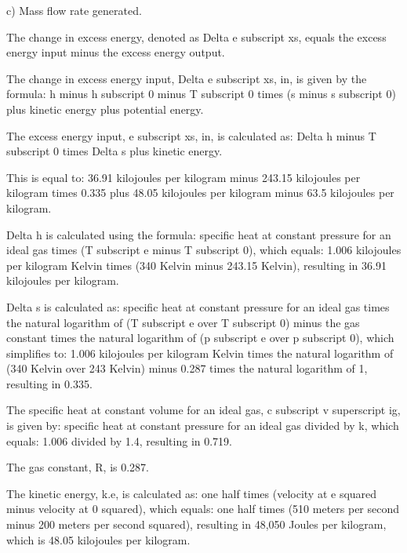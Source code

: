 c) Mass flow rate generated.

The change in excess energy, denoted as Delta e subscript xs, equals the excess energy input minus the excess energy output.

The change in excess energy input, Delta e subscript xs, in, is given by the formula:
h minus h subscript 0 minus T subscript 0 times (s minus s subscript 0) plus kinetic energy plus potential energy.

The excess energy input, e subscript xs, in, is calculated as:
Delta h minus T subscript 0 times Delta s plus kinetic energy.

This is equal to:
36.91 kilojoules per kilogram minus 243.15 kilojoules per kilogram times 0.335 plus 48.05 kilojoules per kilogram minus 63.5 kilojoules per kilogram.

Delta h is calculated using the formula:
specific heat at constant pressure for an ideal gas times (T subscript e minus T subscript 0), which equals:
1.006 kilojoules per kilogram Kelvin times (340 Kelvin minus 243.15 Kelvin),
resulting in 36.91 kilojoules per kilogram.

Delta s is calculated as:
specific heat at constant pressure for an ideal gas times the natural logarithm of (T subscript e over T subscript 0) minus the gas constant times the natural logarithm of (p subscript e over p subscript 0),
which simplifies to:
1.006 kilojoules per kilogram Kelvin times the natural logarithm of (340 Kelvin over 243 Kelvin) minus 0.287 times the natural logarithm of 1, resulting in 0.335.

The specific heat at constant volume for an ideal gas, c subscript v superscript ig, is given by:
specific heat at constant pressure for an ideal gas divided by k, which equals:
1.006 divided by 1.4, resulting in 0.719.

The gas constant, R, is 0.287.

The kinetic energy, k.e, is calculated as:
one half times (velocity at e squared minus velocity at 0 squared), which equals:
one half times (510 meters per second minus 200 meters per second squared),
resulting in 48,050 Joules per kilogram, which is 48.05 kilojoules per kilogram.